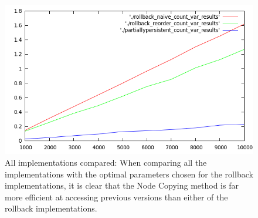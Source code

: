 \begin{figure}[!hbp]
    \includegraphics[width=\textwidth]{figures/rollback_results_count_var_plot.png}
    \caption{All implementations compared: When comparing all the
    implementations with the optimal parameters chosen for the rollback
    implementations, it is clear that the Node Copying method is far more
    efficient at accessing previous versions than either of the rollback
    implementations.}
    \label{fig:rollback_results_count_var_plot.png}
\end{figure}
